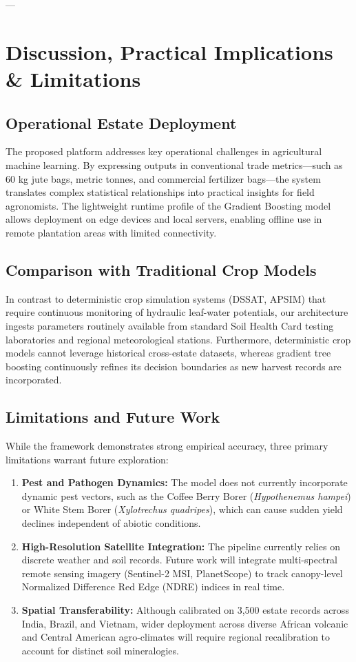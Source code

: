 \documentclass[conference]{IEEEtran}
\begin{document}
---

\section{Discussion, Practical Implications \& Limitations}

\subsection{Operational Estate Deployment}
The proposed platform addresses key operational challenges in agricultural machine learning. By expressing outputs in conventional trade metrics—such as 60 kg jute bags, metric tonnes, and commercial fertilizer bags—the system translates complex statistical relationships into practical insights for field agronomists. The lightweight runtime profile of the Gradient Boosting model allows deployment on edge devices and local servers, enabling offline use in remote plantation areas with limited connectivity.

\subsection{Comparison with Traditional Crop Models}
In contrast to deterministic crop simulation systems (DSSAT, APSIM) that require continuous monitoring of hydraulic leaf-water potentials, our architecture ingests parameters routinely available from standard Soil Health Card testing laboratories and regional meteorological stations. Furthermore, deterministic crop models cannot leverage historical cross-estate datasets, whereas gradient tree boosting continuously refines its decision boundaries as new harvest records are incorporated.

\subsection{Limitations and Future Work}
While the framework demonstrates strong empirical accuracy, three primary limitations warrant future exploration:
\begin{enumerate}
    \item \textbf{Pest and Pathogen Dynamics:} The model does not currently incorporate dynamic pest vectors, such as the Coffee Berry Borer (\textit{Hypothenemus hampei}) or White Stem Borer (\textit{Xylotrechus quadripes}), which can cause sudden yield declines independent of abiotic conditions.
    \item \textbf{High-Resolution Satellite Integration:} The pipeline currently relies on discrete weather and soil records. Future work will integrate multi-spectral remote sensing imagery (Sentinel-2 MSI, PlanetScope) to track canopy-level Normalized Difference Red Edge (NDRE) indices in real time.
    \item \textbf{Spatial Transferability:} Although calibrated on 3,500 estate records across India, Brazil, and Vietnam, wider deployment across diverse African volcanic and Central American agro-climates will require regional recalibration to account for distinct soil mineralogies.
\end{enumerate}
\end{document}
